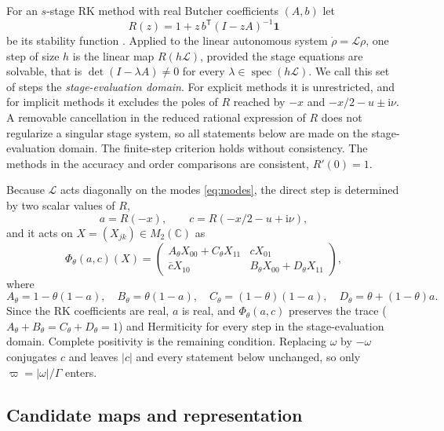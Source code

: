 \documentclass[pdflatex,sn-mathphys-num]{sn-jnl}
\newcommand{\spec}{\operatorname{spec}}
\newcommand{\ii}{\mathrm{i}}
\newcommand{\Lgen}{\mathcal L}
\theoremstyle{thmstyleone}
\theoremstyle{thmstylethree}
\theoremstyle{thmstyletwo}
\begin{document}
For an $s$-stage RK method with real Butcher coefficients $(A,b)$ let
\begin{equation}
 R(z)=1+z\,b^{\mathsf T}(I-zA)^{-1}\mathbf 1
 \label{eq:stability_function}
\end{equation}
be its stability function \cite{HairerNorsettWanner1993}. Applied to the linear autonomous system $\dot\rho=\Lgen\rho$, one step of size $h$ is the linear map $R(h\Lgen)$, provided the stage equations are solvable, that is $\det(I-\lambda A)\ne0$ for every $\lambda\in\spec(h\Lgen)$. We call this set of steps the \emph{stage-evaluation domain}. For explicit methods it is unrestricted, and for implicit methods it excludes the poles of $R$ reached by $-x$ and $-x/2-u\pm\ii\nu$. A removable cancellation in the reduced rational expression of $R$ does not regularize a singular stage system, so all statements below are made on the stage-evaluation domain. The finite-step criterion holds without consistency. The methods in the accuracy and order comparisons are consistent, $R'(0)=1$.

Because $\Lgen$ acts diagonally on the modes \eqref{eq:modes}, the direct step is determined by two scalar values of $R$,
\begin{equation}
 a=R(-x),\qquad c=R(-x/2-u+\ii\nu),
 \label{eq:multipliers}
\end{equation}
and it acts on $X=(X_{jk})\in M_2(\mathbb C)$ as
\begin{equation}
 \Phi_\theta(a,c)(X)=
 \begin{pmatrix}
 A_\theta X_{00}+C_\theta X_{11} & cX_{01}\\
 \bar cX_{10} & B_\theta X_{00}+D_\theta X_{11}
 \end{pmatrix},
 \label{eq:direct_map}
\end{equation}
where
\begin{equation}
 A_\theta=1-\theta(1-a),\quad B_\theta=\theta(1-a),\quad
 C_\theta=(1-\theta)(1-a),\quad D_\theta=\theta+(1-\theta)a.
 \label{eq:ABCD}
\end{equation}
Since the RK coefficients are real, $a$ is real, and $\Phi_\theta(a,c)$ preserves the trace (${A_\theta+B_\theta=C_\theta+D_\theta=1}$) and Hermiticity for every step in the stage-evaluation domain. Complete positivity is the remaining condition. Replacing $\omega$ by $-\omega$ conjugates $c$ and leaves $|c|$ and every statement below unchanged, so only $\varpi=|\omega|/\Gamma$ enters.

\subsection{Candidate maps and representation}\label{sec:candidate_def}
\end{document}

